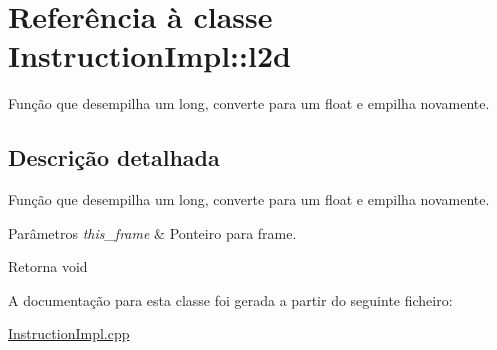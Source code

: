 \hypertarget{class_instruction_impl_1_1l2d}{}\section{Referência à classe Instruction\+Impl\+:\+:l2d}
\label{class_instruction_impl_1_1l2d}


Função que desempilha um long, converte para um float e empilha novamente.  




\subsection{Descrição detalhada}
Função que desempilha um long, converte para um float e empilha novamente. 


\begin{DoxyParams}{Parâmetros}
{\em this\+\_\+frame} & Ponteiro para frame. \\
\hline
\end{DoxyParams}
\begin{DoxyReturn}{Retorna}
void 
\end{DoxyReturn}


A documentação para esta classe foi gerada a partir do seguinte ficheiro\+:\begin{DoxyCompactItemize}
\item 
\hyperlink{_instruction_impl_8cpp}{Instruction\+Impl.\+cpp}\end{DoxyCompactItemize}
